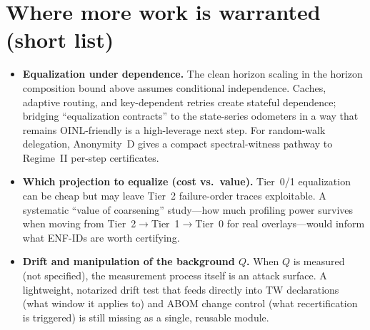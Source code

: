 \documentclass[11pt]{article}
\begin{document}
\section{Where more work is warranted (short list)}
\begin{itemize}[leftmargin=*]
\item \textbf{Equalization under dependence.} The clean horizon scaling in the horizon composition bound above assumes conditional independence.
Caches, adaptive routing, and key-dependent retries create stateful dependence; bridging ``equalization contracts'' to the state-series odometers in a way that remains OINL-friendly is a high-leverage next step. For random-walk delegation, Anonymity~D gives a compact spectral-witness pathway to Regime~II per-step certificates.\cite{series:state1,series:condcert,series:spectral2budget}
\item \textbf{Which projection to equalize (cost vs.\ value).} Tier~0/1 equalization can be cheap but may leave Tier~2 failure-order traces exploitable.
A systematic ``value of coarsening'' study---how much profiling power survives when moving from Tier~2$\to$Tier~1$\to$Tier~0 for real overlays---would inform what ENF-IDs are worth certifying.\cite{series:traceifaces}
\item \textbf{Drift and manipulation of the background $Q$.} When $Q$ is measured (not specified), the measurement process itself is an attack surface.
A lightweight, notarized drift test that feeds directly into TW declarations (what window it applies to) and ABOM change control (what recertification is triggered) is still missing as a single, reusable module.\cite{series:threatwindows,series:accountingrulebook,series:abomoinl}
\end{itemize}
\end{document}
